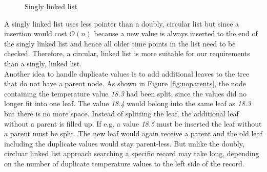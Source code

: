 \documentclass[abstracton,12pt]{scrreprt}
\begin{document}
\begin{figure}[H]
	\vspace{2mm}
	\caption{Singly linked list}
	\label{fig:SinglyLinked}
\end{figure}
A singly linked list uses less pointer than a doubly, circular list but since a insertion would cost $O(n)$ because a new value is always inserted to the end of the singly linked list and hence all older time points in the list need to be checked. Therefore, a circular, linked list is more suitable for our requirements than a singly, linked list. \\
Another idea to handle duplicate values is to add additional leaves to the tree that do not have a parent node. As shown in Figure \ref{fig:noparents}, the node containing the temperature value \emph{18.3} had been split, since the values did no longer fit into one leaf. The value \emph{18.4} would belong into the same leaf as \emph{18.3} but there is no more space. Instead of splitting the leaf, the additional leaf without a parent is filled up. If e.g. a value \emph{18.5} must be inserted the leaf without a parent must be split. The new leaf would again receive a parent and the old leaf including the duplicate values would stay parent-less. But unlike the doubly, circluar linked list approach searching a specific record may take long, depending on the number of duplicate temperature values to the left side of the record.
\end{document}
